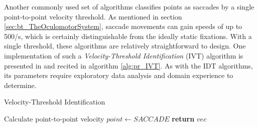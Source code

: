 Another commonly used set of algorithms classifies points as saccades by a single point-to-point velocity threshold. As mentioned in section \ref{sec:bt_TheOculomotorSystem}, saccade movements can gain speeds of up to 500\degree/s, which is certainly distinguishable from the ideally static fixations. With a single threshold, these algorithms are relatively straightforward to design. One implementation of such a \textit{Velocity-Threshold Identification} (IVT) algorithm is presented in \cite{salvucci2000} and recited in algorithm \ref{alg:pr_IVT}. As with the IDT algorithms, its parameters require exploratory data analysis and domain experience to determine. 

\begin{algorithm}
    \caption{Velocity-Threshold Identification}
    \label{alg:pr_IVT}
    \begin{algorithmic}[1]
                \State Calculate point-to-point velocity
            \EndFor
                    \State $point \gets SACCADE$
                \EndIf
            \EndFor
            \State \textbf{return} $vec$
        \EndProcedure
    \end{algorithmic}
\end{algorithm}

